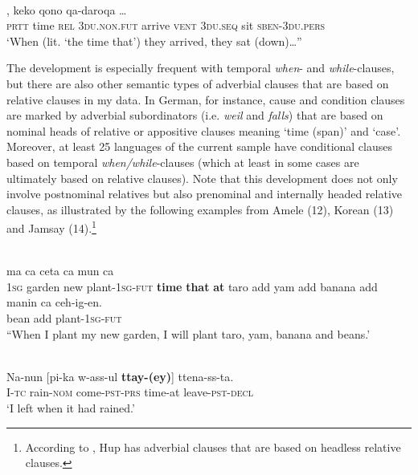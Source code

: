 \documentclass[output=paper]{langsci/langscibook}
\begin{document}
\ea\label{ex:key:}
\\
,  keko  qono  qa-daroqa …\\
        \textsc{prtt}   time  \textsc{rel}   3\textsc{du.non.fut}  arrive  \textsc{vent}  \textsc{3du.seq}  sit  \textsc{sben-3du.pers}\\
\glt   `When (lit. ‘the time that’) they arrived, they sat (down)…”
\z

The development is especially frequent with temporal \textit{when}- and \textit{while}-clauses, but there are also other semantic types of adverbial clauses that are based on relative clauses in my data. In German, for instance, cause and condition clauses are marked by adverbial subordinators (i.e. \textit{weil} and \textit{falls}) that are based on nominal heads of relative or appositive clauses meaning ‘time (span)’ and ‘case’. Moreover, at least 25 languages of the current sample have conditional clauses based on temporal \textit{when/while}-clauses (which at least in some cases are ultimately based on relative clauses). Note that this development does not only involve postnominal relatives but also prenominal and internally headed relative clauses, as illustrated by the following examples from Amele (12), Korean (13) and Jamsay (14).\footnote{According to \citet{Epps2009}, Hup has adverbial clauses that are based on headless relative clauses.} 

\ea\label{ex:key:}
\\
   ma   ca  ceta  ca   mun    ca\\
        1\textsc{sg}   garden   new   plant-1\textsc{sg-fut}   \textbf{time}   \textbf{that   }\textbf{at}   taro   add  yam  add  banana  add\\
\gll   manin    ca  ceh-ig-en.\\
       bean    add  plant-\textsc{1sg-fut}\\
\glt “When I plant my new garden, I will plant taro, yam, banana and beans.'
\z

\ea\label{ex:key:}
\\
\gll   Na-nun  [pi-ka  w-ass-ul   \textbf{ttay-(ey)}]    ttena-ss-ta.\\
       I-\textsc{tc}  rain-\textsc{nom}  come-\textsc{pst-prs}  time-at     leave-\textsc{pst-decl}\\
\glt   `I left when it had rained.' 
\z
\end{document}
